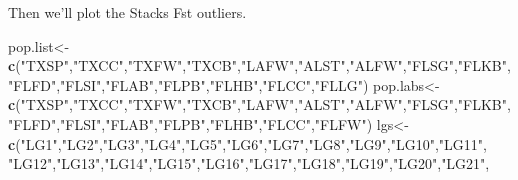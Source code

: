\documentclass[11pt,]{article}
\newenvironment{Shaded}{\begin{snugshade}}{\end{snugshade}}
\newcommand{\KeywordTok}[1]{\textcolor[rgb]{0.13,0.29,0.53}{\textbf{#1}}}
\newcommand{\DataTypeTok}[1]{\textcolor[rgb]{0.13,0.29,0.53}{#1}}
\newcommand{\FloatTok}[1]{\textcolor[rgb]{0.00,0.00,0.81}{#1}}
\newcommand{\StringTok}[1]{\textcolor[rgb]{0.31,0.60,0.02}{#1}}
\newcommand{\OperatorTok}[1]{\textcolor[rgb]{0.81,0.36,0.00}{\textbf{#1}}}
\newcommand{\NormalTok}[1]{#1}
\begin{document}
\begin{Shaded}
\end{Shaded}

Then we'll plot the Stacks Fst outliers.

\begin{Shaded}
\begin{Highlighting}[]
\NormalTok{pop.list<-}\KeywordTok{c}\NormalTok{(}\StringTok{"TXSP"}\NormalTok{,}\StringTok{"TXCC"}\NormalTok{,}\StringTok{"TXFW"}\NormalTok{,}\StringTok{"TXCB"}\NormalTok{,}\StringTok{"LAFW"}\NormalTok{,}\StringTok{"ALST"}\NormalTok{,}\StringTok{"ALFW"}\NormalTok{,}\StringTok{"FLSG"}\NormalTok{,}\StringTok{"FLKB"}\NormalTok{,}
    \StringTok{"FLFD"}\NormalTok{,}\StringTok{"FLSI"}\NormalTok{,}\StringTok{"FLAB"}\NormalTok{,}\StringTok{"FLPB"}\NormalTok{,}\StringTok{"FLHB"}\NormalTok{,}\StringTok{"FLCC"}\NormalTok{,}\StringTok{"FLLG"}\NormalTok{)}
\NormalTok{pop.labs<-}\KeywordTok{c}\NormalTok{(}\StringTok{"TXSP"}\NormalTok{,}\StringTok{"TXCC"}\NormalTok{,}\StringTok{"TXFW"}\NormalTok{,}\StringTok{"TXCB"}\NormalTok{,}\StringTok{"LAFW"}\NormalTok{,}\StringTok{"ALST"}\NormalTok{,}\StringTok{"ALFW"}\NormalTok{,}\StringTok{"FLSG"}\NormalTok{,}\StringTok{"FLKB"}\NormalTok{,}
            \StringTok{"FLFD"}\NormalTok{,}\StringTok{"FLSI"}\NormalTok{,}\StringTok{"FLAB"}\NormalTok{,}\StringTok{"FLPB"}\NormalTok{,}\StringTok{"FLHB"}\NormalTok{,}\StringTok{"FLCC"}\NormalTok{,}\StringTok{"FLFW"}\NormalTok{)}
\NormalTok{lgs<-}\KeywordTok{c}\NormalTok{(}\StringTok{"LG1"}\NormalTok{,}\StringTok{"LG2"}\NormalTok{,}\StringTok{"LG3"}\NormalTok{,}\StringTok{"LG4"}\NormalTok{,}\StringTok{"LG5"}\NormalTok{,}\StringTok{"LG6"}\NormalTok{,}\StringTok{"LG7"}\NormalTok{,}\StringTok{"LG8"}\NormalTok{,}\StringTok{"LG9"}\NormalTok{,}\StringTok{"LG10"}\NormalTok{,}\StringTok{"LG11"}\NormalTok{,}
    \StringTok{"LG12"}\NormalTok{,}\StringTok{"LG13"}\NormalTok{,}\StringTok{"LG14"}\NormalTok{,}\StringTok{"LG15"}\NormalTok{,}\StringTok{"LG16"}\NormalTok{,}\StringTok{"LG17"}\NormalTok{,}\StringTok{"LG18"}\NormalTok{,}\StringTok{"LG19"}\NormalTok{,}\StringTok{"LG20"}\NormalTok{,}\StringTok{"LG21"}\NormalTok{,}

\end{Highlighting}
\end{Shaded}
\end{document}
